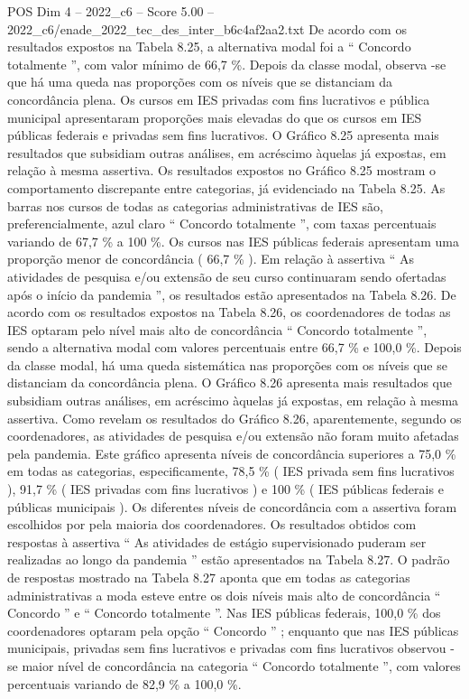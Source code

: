 \begin{textsample}{POS Dim 4 – 2022\_c6 – Score 5.00 – 2022\_c6/enade\_2022\_tec\_des\_inter\_b6c4af2aa2.txt}
De acordo com os resultados expostos na Tabela 8.25, a alternativa modal foi a “ Concordo totalmente ”, com valor mínimo de 66,7 \%.
Depois da classe modal, observa -se que há uma queda nas proporções com os níveis que se distanciam da concordância plena.
Os cursos em IES privadas com fins lucrativos e pública municipal apresentaram proporções mais elevadas do que os cursos em IES públicas federais e privadas sem fins lucrativos.
O Gráfico 8.25 apresenta mais resultados que subsidiam outras análises, em acréscimo àquelas já expostas, em relação à mesma assertiva.
Os resultados expostos no Gráfico 8.25 mostram o comportamento discrepante entre categorias, já evidenciado na Tabela 8.25.
As barras nos cursos de todas as categorias administrativas de IES são, preferencialmente, azul claro “ Concordo totalmente ”, com taxas percentuais variando de 67,7 \% a 100 \%.
Os cursos nas IES públicas federais apresentam uma proporção menor de concordância ( 66,7 \% ).
Em relação à assertiva “ As atividades de pesquisa e/ou extensão de seu curso continuaram sendo ofertadas após o início da pandemia ”, os resultados estão apresentados na Tabela 8.26.
De acordo com os resultados expostos na Tabela 8.26, os coordenadores de todas as IES optaram pelo nível mais alto de concordância “ Concordo totalmente ”, sendo a alternativa modal com valores percentuais entre 66,7 \% e 100,0 \%.
Depois da classe modal, há uma queda sistemática nas proporções com os níveis que se distanciam da concordância plena.
O Gráfico 8.26 apresenta mais resultados que subsidiam outras análises, em acréscimo àquelas já expostas, em relação à mesma assertiva.
Como revelam os resultados do Gráfico 8.26, aparentemente, segundo os coordenadores, as atividades de pesquisa e/ou extensão não foram muito afetadas pela pandemia.
Este gráfico apresenta níveis de concordância superiores a 75,0 \% em todas as categorias, especificamente, 78,5 \% ( IES privada sem fins lucrativos ), 91,7 \% ( IES privadas com fins lucrativos ) e 100 \% ( IES públicas federais e públicas municipais ).
Os diferentes níveis de concordância com a assertiva foram escolhidos por pela maioria dos coordenadores.
Os resultados obtidos com respostas à assertiva “ As atividades de estágio supervisionado puderam ser realizadas ao longo da pandemia ” estão apresentados na Tabela 8.27.
O padrão de respostas mostrado na Tabela 8.27 aponta que em todas as categorias administrativas a moda esteve entre os dois níveis mais alto de concordância “ Concordo ” e “ Concordo totalmente ”.
Nas IES públicas federais, 100,0 \% dos coordenadores optaram pela opção “ Concordo ” ; enquanto que nas IES públicas municipais, privadas sem fins lucrativos e privadas com fins lucrativos observou -se maior nível de concordância na categoria “ Concordo totalmente ”, com valores percentuais variando de 82,9 \% a 100,0 \%.

\end{textsample}
